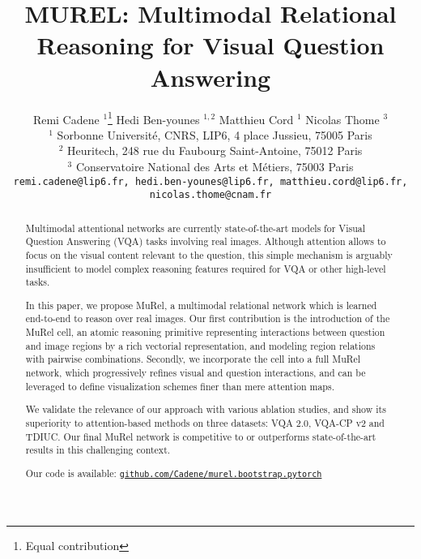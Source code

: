 \documentclass[10pt,twocolumn,letterpaper]{article}
\begin{document}
\newcommand{\cmark}{\ding{51}}\newcommand{\xmark}{\ding{55}}


\newcommand{\MCc}[1]{\textcolor{blue}{[Matt: #1]}}
\newcommand{\MC}[1]{{\color{blue}#1}}
\newcommand{\HB}[1]{{\color{red}#1}}

\title{MUREL: Multimodal Relational Reasoning for Visual Question Answering}

\author{Remi Cadene $^{1}$\thanks{Equal contribution}
\qquad 
Hedi Ben-younes $^{1,2}$\footnotemark[1] 
\qquad  
Matthieu Cord $^1$  
\qquad 
Nicolas Thome $^3$ 
\\ $^1$ Sorbonne Universit\'e, CNRS, LIP6, 4 place Jussieu, 75005 Paris
\\ $^2$ Heuritech, 248 rue du Faubourg Saint-Antoine, 75012 Paris 
\\ $^3$ Conservatoire National des Arts et M\'etiers, 75003 Paris
\\  {\tt\small remi.cadene@lip6.fr,
hedi.ben-younes@lip6.fr,
matthieu.cord@lip6.fr, nicolas.thome@cnam.fr}
}

\maketitle


\begin{abstract}


Multimodal attentional networks are currently state-of-the-art models for Visual Question Answering (VQA) tasks involving real images. Although attention allows to focus on the visual content relevant to the question, this simple mechanism is arguably insufficient to model complex reasoning features required for VQA or other high-level tasks. 

In this paper, we propose MuRel, a multimodal relational network which is learned end-to-end to reason over real images. Our first contribution is the introduction of the MuRel cell, an atomic reasoning primitive representing interactions between question and image regions by a rich vectorial representation, and modeling region relations with pairwise combinations.
Secondly, we incorporate the cell into a full MuRel network, which progressively refines visual and question interactions, and can be leveraged to define visualization schemes finer than mere attention maps. 

We validate the relevance of our approach with various ablation studies, and show its superiority to attention-based methods on three datasets: VQA 2.0, VQA-CP v2 and TDIUC. Our final MuRel network is competitive to or outperforms state-of-the-art results in this challenging context.

Our code is available: \href{https://github.com/Cadene/murel.bootstrap.pytorch}{\texttt{github.com/Cadene/\linebreak murel.bootstrap.pytorch}}
\end{abstract}
\end{document}
